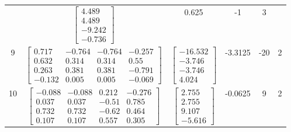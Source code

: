 \documentclass[a4paper,12pt]{article}
\begin{document}
\begin{tabular}{c c c c c c}
&
$\begin{bmatrix} 4.489 \\ 4.489 \\ -9.242 \\ -0.736 \end{bmatrix}$
&
0.625
&
-1
&
3
\\
9
&
$\begin{bmatrix} 0.717 & -0.764 & -0.764 & -0.257 \\ 0.632 & 0.314 & 0.314 & 0.55 \\ 0.263 & 0.381 & 0.381 & -0.791 \\ -0.132 & 0.005 & 0.005 & -0.069 \end{bmatrix}$
&
$\begin{bmatrix} -16.532 \\ -3.746 \\ -3.746 \\ 4.024 \end{bmatrix}$
&
-3.3125
&
-20
&
2
\\
10
&
$\begin{bmatrix} -0.088 & -0.088 & 0.212 & -0.276 \\ 0.037 & 0.037 & -0.51 & 0.785 \\ 0.732 & 0.732 & -0.62 & 0.464 \\ 0.107 & 0.107 & 0.557 & 0.305 \end{bmatrix}$
&
$\begin{bmatrix} 2.755 \\ 2.755 \\ 9.107 \\ -5.616 \end{bmatrix}$
&
-0.0625
&
9
&
2
\\
\end{tabular} \egroup \newpage
\end{document}
